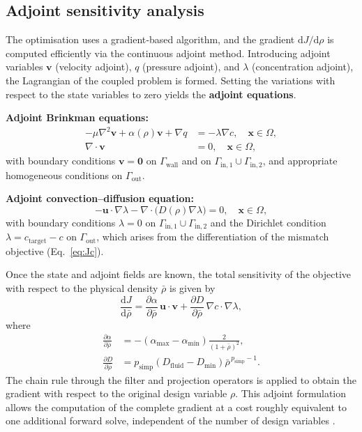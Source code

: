 \documentclass[12pt]{article}
\begin{document}
\subsection{Adjoint sensitivity analysis}
The optimisation uses a gradient‑based algorithm, and the gradient $\mathrm{d}J/\mathrm{d}\rho$ is computed efficiently via the continuous adjoint method. Introducing adjoint variables $\mathbf{v}$ (velocity adjoint), $q$ (pressure adjoint), and $\lambda$ (concentration adjoint), the Lagrangian of the coupled problem is formed. Setting the variations with respect to the state variables to zero yields the \textbf{adjoint equations}.

\textbf{Adjoint Brinkman equations:}
\begin{align}
-\mu \nabla^2 \mathbf{v} + \alpha(\rho) \mathbf{v} + \nabla q &= -\lambda \nabla c, \quad \mathbf{x} \in \Omega, \label{eq:adj_flow}\\
\nabla \cdot \mathbf{v} &= 0, \quad \mathbf{x} \in \Omega, \label{eq:adj_div}
\end{align}
with boundary conditions $\mathbf{v} = \mathbf{0}$ on $\Gamma_{\text{wall}}$ and on $\Gamma_{\text{in},1} \cup \Gamma_{\text{in},2}$, and appropriate homogeneous conditions on $\Gamma_{\text{out}}$.

\textbf{Adjoint convection–diffusion equation:}
\begin{equation}
-\mathbf{u} \cdot \nabla \lambda - \nabla \cdot \bigl( D(\rho) \nabla \lambda \bigr) = 0, \quad \mathbf{x} \in \Omega, \label{eq:adj_conc}
\end{equation}
with boundary conditions $\lambda = 0$ on $\Gamma_{\text{in},1} \cup \Gamma_{\text{in},2}$ and the Dirichlet condition $\lambda = c_{\text{target}} - c$ on $\Gamma_{\text{out}}$, which arises from the differentiation of the mismatch objective (Eq.~\eqref{eq:Jc}).

Once the state and adjoint fields are known, the total sensitivity of the objective with respect to the physical density $\bar{\rho}$ is given by
\begin{equation}
\frac{\mathrm{d}J}{\mathrm{d}\bar{\rho}} = 
\frac{\partial \alpha}{\partial \bar{\rho}} \, \mathbf{u}\cdot\mathbf{v} 
+ \frac{\partial D}{\partial \bar{\rho}} \, \nabla c \cdot \nabla \lambda, \label{eq:sensitivity}
\end{equation}
where
\begin{align}
\frac{\partial \alpha}{\partial \bar{\rho}} &= - (\alpha_{\max} - \alpha_{\min}) \frac{2}{(1+\bar{\rho})^2}, \label{eq:dalpha}\\
\frac{\partial D}{\partial \bar{\rho}} &= p_{\text{simp}} (D_{\text{fluid}} - D_{\min}) \bar{\rho}^{\,p_{\text{simp}}-1}. \label{eq:dD}
\end{align}
The chain rule through the filter and projection operators is applied to obtain the gradient with respect to the original design variable $\rho$. This adjoint formulation allows the computation of the complete gradient at a cost roughly equivalent to one additional forward solve, independent of the number of design variables \cite{aage2008, giles2000}.
\end{document}
